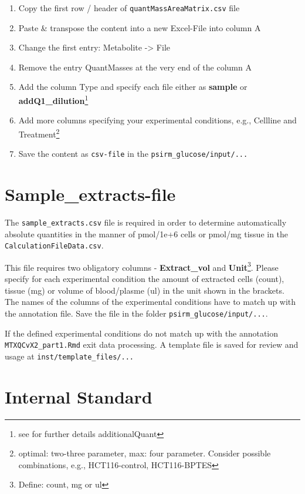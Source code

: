 \documentclass[]{book}
\providecommand{\tightlist}{%
  \setlength{\itemsep}{0pt}\setlength{\parskip}{0pt}}
\let\rmarkdownfootnote\footnote%
\def\footnote{\protect\rmarkdownfootnote}
\begin{document}
\begin{enumerate}
\def\labelenumi{\arabic{enumi}.}
\tightlist
\item
  Copy the first row / header of \texttt{quantMassAreaMatrix.csv} file
\item
  Paste \& transpose the content into a new Excel-File into column A
\item
  Change the first entry: Metabolite -\textgreater{} File
\item
  Remove the entry QuantMasses at the very end of the column A
\item
  Add the column Type and specify each file either as \textbf{sample} or
  \textbf{addQ1\_dilution}\footnote{see for further details
    additionalQuant}
\item
  Add more columns specifying your experimental conditions, e.g.,
  Cellline and Treatment\footnote{optimal: two-three parameter, max:
    four parameter. Consider possible combinations, e.g.,
    HCT116-control, HCT116-BPTES}
\item
  Save the content as \texttt{csv-file} in the
  \texttt{psirm\_glucose/input/...}
\end{enumerate}

\section{Sample\_extracts-file}\label{sample_extracts-file}

The \texttt{sample\_extracts.csv} file is required in order to determine
automatically absolute quantities in the manner of pmol/1e+6 cells or
pmol/mg tissue in the \texttt{CalculationFileData.csv}.

This file requires two obligatory columns - \textbf{Extract\_vol} and
\textbf{Unit}\footnote{Define: count, mg or ul}. Please specify for each
experimental condition the amount of extracted cells (count), tissue
(mg) or volume of blood/plasme (ul) in the unit shown in the brackets.\\
The names of the columns of the experimental conditions have to match up
with the annotation file. Save the file in the folder
\texttt{psirm\_glucose/input/...}.

If the defined experimental conditions do not match up with the
annotation \texttt{MTXQCvX2\_part1.Rmd} exit data processing. A template
file is saved for review and usage at \texttt{inst/template\_files/...}

\section{Internal Standard}\label{internal-standard}
\end{document}
